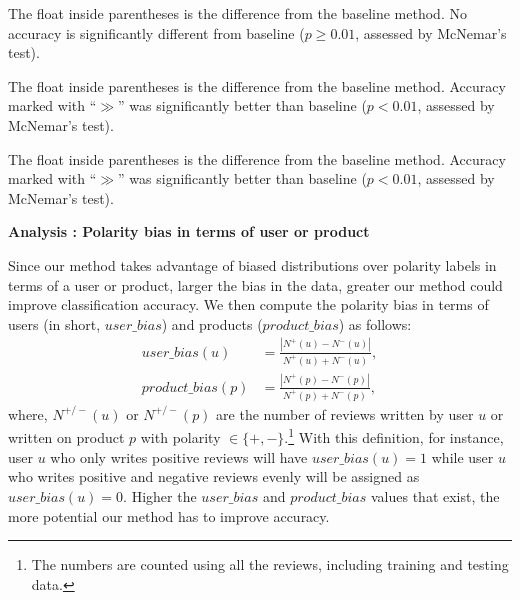 \documentclass[english]{jnlp_1.4}
\begin{document}
\begin{table}[p]
\label{table:accDistPang}

\vspace{4pt}\small
The float inside parentheses is the difference from the baseline method. No accuracy is significantly different from baseline ($p \geq 0.01$, assessed by McNemar's test).
\par
\end{table}
\begin{table}[p]
\label{table:accDistBlitzer}

\vspace{4pt}\small
The float inside parentheses is the difference from the baseline method. Accuracy marked with ``$\gg$''  was significantly better than baseline ($p < 0.01$, assessed by McNemar's test).
\par
\end{table}
\begin{table}[p]
\label{table:accDistMaas}

\vspace{4pt}\small
The float inside parentheses is the difference from the baseline method. Accuracy marked with ``$\gg$''  was significantly better than baseline ($p < 0.01$, assessed by McNemar's test).
\par
\end{table}


\noindent
\textbf{Analysis {}: Polarity bias in terms of user or product}

Since our method takes advantage of biased distributions over polarity labels in terms of a user or product, larger the bias in the data, greater our method could improve classification accuracy.
We then compute the polarity bias in terms of users (in short, $user\_bias$) and products ($product\_bias$) as follows:
\begin{align*}
user\_bias(u)&=\frac{|N^+(u)-N^-(u)|}{N^+(u)+N^-(u)},\\
product\_bias(p)&=\frac{|N^+(p)-N^-(p)|}{N^+(p)+N^-(p)},
\end{align*}
where, $N^{+/-}(u)$ or $N^{+/-}(p)$ are the number of reviews written by user $u$ or written on product $p$ with polarity $\in\{+,-\}$.\footnote{The numbers are counted using all the reviews, including training and testing data.} 
With this definition, for instance, user $u$ who only writes positive reviews will have $user\_bias(u)=1$ while user $u$ who writes positive and negative reviews evenly will be assigned as $user\_bias(u)=0$.
Higher the $user\_bias$ and $product\_bias$ values that exist, the more potential our method has to improve accuracy.
\end{document}
